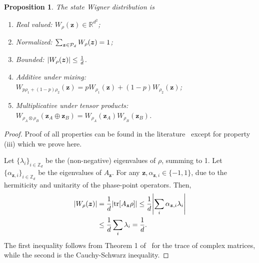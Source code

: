 \documentclass[
twocolumn,
superscriptaddress
]{revtex4-1}
\newtheorem{proposition}[theorem]{Proposition}
\renewcommand{\tr}{{\rm{tr}}}
\def\z{\boldsymbol{z}}
\renewcommand{\P}{{\cal P}}
\begin{document}
\begin{proposition}\label{thm:wstate}
  The state Wigner distribution is
  \begin{enumerate}
    \item[(i)]\label{en:w1} Real valued: $W_\rho(\z) \in \mathbb{R}^{d^2}$;
    \item[(ii)]\label{en:w2} Normalized: $\sum_{\z \in \P_d} W_\rho(\z) = 1$;
    \item[(iii)]\label{en:w3} Bounded: $\abs{W_\rho(\z)} \leq \frac{1}{d}$.
    \item[(iv)]\label{en:w4} Additive under mixing: \vspace{2pt}\\
    $W_{p\rho_1 + (1-p)\rho_2}(\z) = p W_{\rho_1}(\z) + (1-p) W_{\rho_2}(\z)$;
    \item[(v)]\label{en:w5} Multiplicative under tensor products: \vspace{2pt}\\
    $W_{\rho_A \otimes \rho_B}(\z_A \oplus \z_B) = W_{\rho_A}(\z_A)W_{\rho_B}(\z_B)$.
	\end{enumerate}
\end{proposition}
\begin{proof}
	Proof of all properties can be found in the literature~\cite{cit:veitch,Vourdas_2004,Gross2006,Wang_2019} except for property (iii) which we prove here.
	
Let $\{\lambda_i\}_{i \in \mathbb{Z}_d}$ be the (non-negative) eigenvalues of $\rho$, summing to 1.
Let $\{\alpha_{\z,i}\}_{i \in \mathbb{Z}_d}$ be the eigenvalues of $A_{\z}$. For any $\z, \alpha_{\z,i} \in \{-1, 1\}$, due to the hermiticity and unitarity of the phase-point operators. 
Then,
\begin{align}
	\abs{W_{\rho}(\z)} &= \frac{1}{d}\abs{\tr[A_{\z} \rho]} \leq \frac{1}{d} \abs{\sum_i \alpha_{\z,i} \lambda_i} \nonumber\\ &\leq \frac{1}{d}\sum_i \lambda_i = \frac{1}{d}.
\end{align}
The first inequality follows from Theorem 1 of~\cite{cit:mirsky} for the trace of complex matrices, while the second is the Cauchy-Schwarz inequality.
\end{proof}
\end{document}
